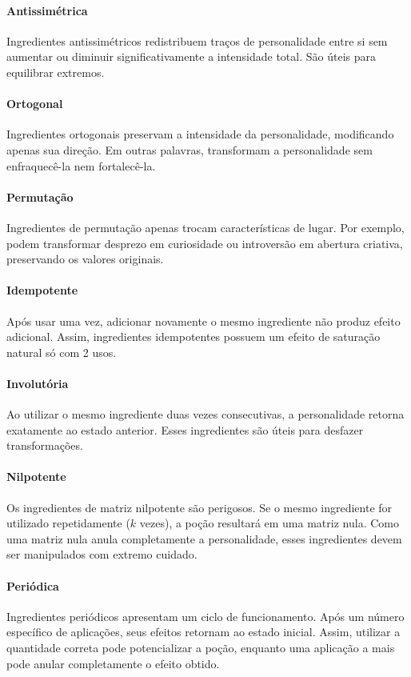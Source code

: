 \documentclass[12pt]{article}
\begin{document}
\paragraph{Antissimétrica}
Ingredientes antissimétricos redistribuem traços de personalidade entre si sem aumentar ou diminuir significativamente a intensidade total. São úteis para equilibrar extremos.

\paragraph{Ortogonal}
Ingredientes ortogonais preservam a intensidade da personalidade, modificando apenas sua direção. Em outras palavras, transformam a personalidade sem enfraquecê-la nem fortalecê-la.

\paragraph{Permutação}
Ingredientes de permutação apenas trocam características de lugar. Por exemplo, podem transformar desprezo em curiosidade ou introversão em abertura criativa, preservando os valores originais.

\paragraph{Idempotente}
Após usar uma vez, adicionar novamente o mesmo ingrediente não produz efeito adicional. Assim, ingredientes idempotentes possuem um efeito de saturação natural só com 2 usos.

\paragraph{Involutória}
Ao utilizar o mesmo ingrediente duas vezes consecutivas, a personalidade retorna exatamente ao estado anterior. Esses ingredientes são úteis para desfazer transformações.

\paragraph{Nilpotente}
Os ingredientes de matriz nilpotente são perigosos. Se o mesmo ingrediente for utilizado repetidamente (\(k\) vezes), a poção resultará em uma matriz nula. Como uma matriz nula anula completamente a personalidade, esses ingredientes devem ser manipulados com extremo cuidado.

\paragraph{Periódica}
Ingredientes periódicos apresentam um ciclo de funcionamento. Após um número específico de aplicações, seus efeitos retornam ao estado inicial. Assim, utilizar a quantidade correta pode potencializar a poção, enquanto uma aplicação a mais pode anular completamente o efeito obtido.
\end{document}
